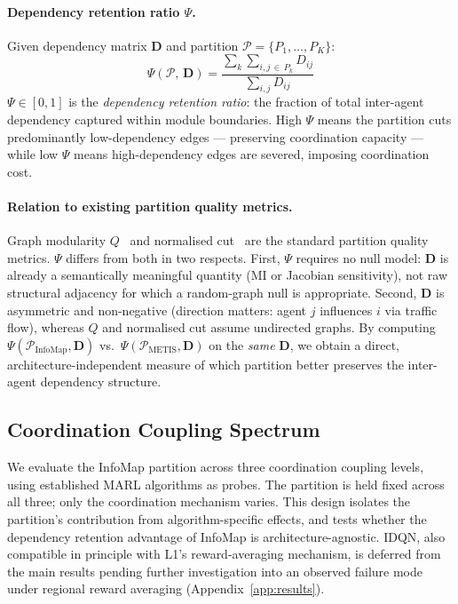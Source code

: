 \documentclass{article}
\begin{document}
\paragraph{Dependency retention ratio $\Psi$.}
Given dependency matrix $\mathbf{D}$ and partition $\mathcal{P}=\{P_1,\ldots,P_K\}$:
\begin{equation}
    \Psi(\mathcal{P},\,\mathbf{D})
    = \frac{\displaystyle\sum_{k}\sum_{i,j\,\in\, P_k} D_{ij}}
    {\displaystyle\sum_{i,j} D_{ij}}
    \label{eq:psi}
\end{equation}
$\Psi \in [0,1]$ is the \emph{dependency retention ratio}: the fraction of total
inter-agent dependency captured within module boundaries.
High $\Psi$ means the partition cuts predominantly low-dependency edges —
preserving coordination capacity — while low $\Psi$ means high-dependency edges
are severed, imposing coordination cost.

\paragraph{Relation to existing partition quality metrics.}
Graph modularity $Q$~\citep{newmangirvan2004} and normalised
cut~\citep{shimalik2000} are the standard partition quality metrics.
$\Psi$ differs from both in two respects.
First, $\Psi$ requires no null model: $\mathbf{D}$ is already a semantically
meaningful quantity (MI or Jacobian sensitivity), not raw structural adjacency
for which a random-graph null is appropriate.
Second, $\mathbf{D}$ is asymmetric and non-negative (direction matters: agent $j$
influences $i$ via traffic flow), whereas $Q$ and normalised cut assume undirected
graphs.
By computing $\Psi(\mathcal{P}_{\mathrm{InfoMap}},\mathbf{D})$ vs.\
$\Psi(\mathcal{P}_{\mathrm{METIS}},\mathbf{D})$ on the \emph{same} $\mathbf{D}$,
we obtain a direct, architecture-independent measure of which partition better
preserves the inter-agent dependency structure.

\subsection{Coordination Coupling Spectrum}
\label{sec:levels}

We evaluate the InfoMap partition across three coordination coupling levels,
using established MARL algorithms as probes. The partition is held fixed across
all three; only the coordination mechanism varies.
This design isolates the partition's contribution from algorithm-specific effects,
and tests whether the dependency retention advantage of InfoMap is
architecture-agnostic. IDQN, also compatible in principle with L1's reward-averaging
mechanism, is deferred from the main results pending further investigation into
an observed failure mode under regional reward averaging (Appendix~\ref{app:results}).
\end{document}
